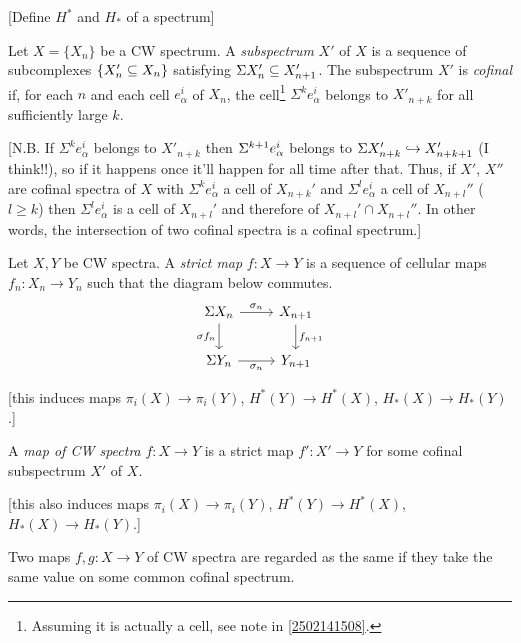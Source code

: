 \documentclass{MetricNotes2023}
\def\subq{\ensuremath\subseteq}
\def\inj{\ensuremath\hookrightarrow}
\def\SIgma{\ensuremath\Sigma}
\begin{document}
[Define \(H^*\) and \(H_*\) of a spectrum]

\begin{definition}
Let \(X=\{X_n\}\) be a CW spectrum. A \textit{subspectrum} \(X'\) of \(X\) is a sequence of subcomplexes \(\{X_n'\subq X_n\}\) satisfying \(\Sigma X_n'\subq X_{n+1}'\). The subspectrum \(X'\) is \textit{cofinal} if, for each \(n\) and each cell \(e^i_\alpha\) of \(X_n\), the cell\footnote{Assuming it is actually a cell, see note in \ref{2502141508}.} \(\Sigma^k e_\alpha^i\) belongs to \(X'_{n+k}\) for all sufficiently large \(k\).
\end{definition}

[N.B. If \(\Sigma^ke^i_\alpha\) belongs to \(X'_{n+k}\) then \(\SIgma^{k+1}e^i_\alpha\) belongs to \(\Sigma X'_{n+k}\inj X'_{n+k+1}\) (I think!!), so if it happens once it'll happen for all time after that. Thus, if \(X'\), \(X''\) are cofinal spectra of \(X\) with \(\Sigma^k e_{\alpha}^i\) a cell of \(X_{n+k}'\) and \(\Sigma^l e_\alpha^i\) a cell of \(X_{n+l}''\) (\(l\geq k\)) then \(\Sigma^l e_\alpha^i\) is a cell of \(X_{n+l}'\) and therefore of \(X_{n+l}'\cap X_{n+l}''\). In other words, the intersection of two cofinal spectra is a cofinal spectrum.]

\begin{definition}
Let \(X, Y\) be CW spectra. A \textit{strict map} \(f : X \to Y\) is a sequence of cellular maps \(f_n : X_n \to Y_n\) such that the diagram below commutes.
\[\begin{tikzcd}
\Sigma X_n \arrow[r, "\sigma_n"] \arrow[d, swap, "\sigma f_n"]  & X_{n+1} \arrow[d, "f_{n+1}"]  \\
\SIgma Y_n \arrow[r, swap, "\sigma_n"]  & Y_{n+1}
\end{tikzcd}\]
\end{definition}

[this induces maps \(\pi_i(X)\to\pi_i(Y)\), \(H^*(Y)\to H^*(X)\), \(H_*(X)\to H_*(Y)\).]

\begin{definition}
A \textit{map of CW spectra} \(f : X \to Y\) is a strict map \(f' : X' \to Y\) for some cofinal subspectrum \(X'\) of \(X\).
\end{definition}

[this also induces maps \(\pi_i(X)\to\pi_i(Y)\), \(H^*(Y)\to H^*(X)\), \(H_*(X)\to H_*(Y)\).]

Two maps \(f, g : X \to Y\) of CW spectra are regarded as the same if they take the same value on some common cofinal spectrum.
\end{document}
